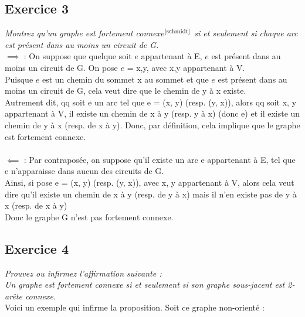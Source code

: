 \documentclass{article}      %
\begin{document}
\subsection{Exercice 3}
\textit{\textcolor{exogris}{
Montrez qu’un graphe est fortement connexe$^\text{\cite{schmidt}}$ si et seulement si chaque arc est présent dans au moins un circuit de G.
}}
\\$\implies$ : On suppose que quelque soit $e$ appartenant à E, $e$ est présent dans au moins un circuit de G. On pose $e$ = {x,y}, avec x,y appartenant à V.
\\Puisque $e$ est un chemin du sommet x au sommet et que $e$ est présent dans au moins un circuit de G, cela veut dire que le chemin de y à x existe.
\\Autrement dit, qq soit e un arc tel que e = (x, y) (resp. (y, x)), alors qq soit x, y appartenant à V, il existe un chemin de x à y (resp. y à x) (donc e) et il existe un chemin de y à x (resp. de x à y). Donc, par définition, cela implique que le graphe est fortement connexe.
%
\\\\$\impliedby$ :  Par contraposée, on suppose qu'il existe un arc e appartenant à E, tel que e n'apparaisse dans aucun des circuits de G. 
\\Ainsi, si pose e = (x, y) (resp. (y, x)), avec x, y appartenant à V, alors cela veut dire qu'il existe un chemin de x à y (resp. de y à x) mais il n'en existe pas de y à x (resp. de x à y)
\\Donc le graphe G n'est pas fortement connexe.



\subsection{Exercice 4}
\textit{\textcolor{exogris}{
Prouvez ou infirmez l’affirmation suivante :
\\Un graphe est fortement connexe si et seulement si son graphe sous-jacent est 2-arête connexe.
}}
\\Voici un exemple qui infirme la proposition.
Soit ce graphe non-orienté :
\end{document}
